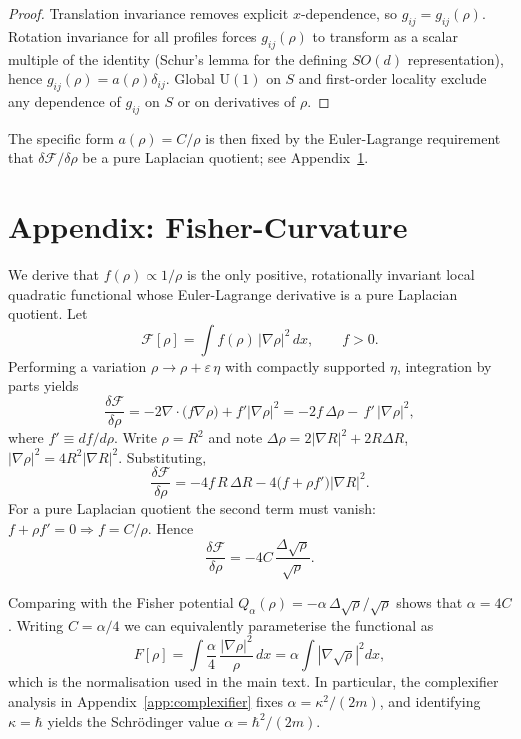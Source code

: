 \documentclass[11pt,a4paper]{article}
\numberwithin{equation}{section}
\theoremstyle{thmcompact}
\theoremstyle{remark}
\begin{document}
\begin{proof}
	Translation invariance removes explicit $x$-dependence, so $g_{ij}=g_{ij}(\rho)$.
	Rotation invariance for all profiles forces $g_{ij}(\rho)$ to transform as a scalar multiple of the identity (Schur’s lemma for the defining $SO(d)$ representation), hence $g_{ij}(\rho)=a(\rho)\delta_{ij}$. Global $\mathrm{U}(1)$ on $S$ and first-order locality exclude any dependence of $g_{ij}$ on $S$ or on derivatives of $\rho$.
	
\end{proof}

The specific form $a(\rho)=C/\rho$ is then fixed by the Euler-Lagrange requirement that $\delta\mathcal F/\delta\rho$ be a pure Laplacian quotient; see Appendix~\ref{app:fisher-proof}.
	
\section{Appendix: Fisher-Curvature}
\label{app:fisher-proof}

We derive that $f(\rho)\propto 1/\rho$ is the only positive,
rotationally invariant local quadratic functional whose Euler-Lagrange derivative
is a pure Laplacian quotient.
Let
\[
\mathcal F[\rho]=\int f(\rho)\,|\nabla\rho|^2\,dx,\qquad f>0.
\]
Performing a variation $\rho\!\to\!\rho+\varepsilon\,\eta$ with compactly supported $\eta$,
integration by parts yields
\[
\frac{\delta\mathcal F}{\delta\rho}
=-2\nabla\!\cdot\!\big(f\nabla\rho\big)+f'|\nabla\rho|^2
=-2f\,\Delta\rho-\,f'\,|\nabla\rho|^2,
\]
where $f' \equiv df/d\rho$.
Write $\rho=R^2$ and note
$\Delta\rho=2|\nabla R|^2+2R\Delta R$, $|\nabla\rho|^2=4R^2|\nabla R|^2$.
Substituting,
\[
\frac{\delta\mathcal F}{\delta\rho}
=-4f\,R\,\Delta R-4\big(f+\rho f'\big)|\nabla R|^2.
\]
For a pure Laplacian quotient the second term must vanish:
\(
f+\rho f'=0\Rightarrow f=C/\rho.
\)
Hence
\[
\frac{\delta\mathcal F}{\delta\rho}
= -4C\,\frac{\Delta\sqrt{\rho}}{\sqrt{\rho}}.
\]

Comparing with the Fisher potential $Q_\alpha(\rho) = -\alpha\,\Delta\sqrt{\rho}/\sqrt{\rho}$ shows that
$\alpha = 4C$. Writing $C=\alpha/4$ we can equivalently parameterise the functional as
\[
F[\rho] = \int \frac{\alpha}{4}\,\frac{|\nabla\rho|^{2}}{\rho}\,dx
= \alpha \int |\nabla\sqrt{\rho}|^{2}dx,
\]
which is the normalisation used in the main text.
In particular, the complexifier analysis in Appendix~\ref{app:complexifier}
fixes $\alpha=\kappa^{2}/(2m)$, and identifying $\kappa=\hbar$ yields the Schrödinger value $\alpha=\hbar^{2}/(2m)$.
\end{document}
